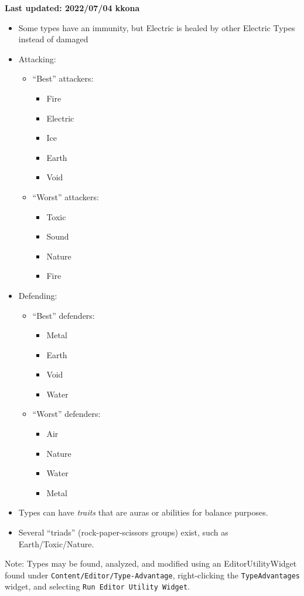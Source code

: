 

\textbf{\color{red}Last updated: 2022/07/04 kkona}

\begin{tldr}
	\begin{itemize}
		\item{Some types have an immunity, but Electric is healed by other Electric Types instead of damaged}
		\item{Attacking:
			\begin{itemize}
				\item{``Best'' attackers:
					\begin{itemize}
						\item{Fire}
						\item{Electric}
						\item{Ice}
						\item{Earth}
						\item{Void}
					\end{itemize}
				}
				\item{``Worst'' attackers:
					\begin{itemize}
						\item{Toxic}
						\item{Sound}
						\item{Nature}
						\item{Fire}
					\end{itemize}
				}
			\end{itemize}
			}
		\item{Defending:
			\begin{itemize}
				\item{``Best'' defenders:
					\begin{itemize}
						\item{Metal}
						\item{Earth}
						\item{Void}
						\item{Water}
					\end{itemize}
				}
				\item{``Worst'' defenders:
					\begin{itemize}
						\item{Air}
						\item{Nature}
						\item{Water}
						\item{Metal}
					\end{itemize}
				}
			\end{itemize}
		}
		\item{Types can have \textit{traits} that are auras or abilities for balance purposes.}
		\item{Several ``triads'' (rock-paper-scissors groups) exist, such as Earth/Toxic/Nature.}
	\end{itemize}
	Note: Types may be found, analyzed, and modified using an EditorUtilityWidget found under \texttt{Content/Editor/Type-Advantage}, right-clicking the \texttt{TypeAdvantages} widget, and selecting \texttt{Run Editor Utility Widget}.
\end{tldr}

